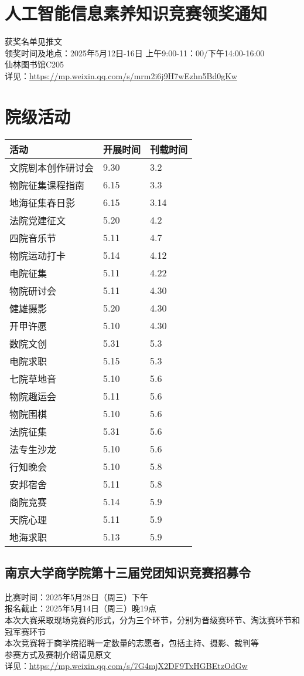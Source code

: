 \documentclass[letterpaper, 12pt]{article}
\begin{document}
\begin{multicols}{2}
\section{人工智能信息素养知识竞赛领奖通知} %
获奖名单见推文
\\领奖时间及地点：2025年5月12日-16日 上午9:00-11：00/下午14:00-16:00
\\仙林图书馆C205
\\详见：\url{https://mp.weixin.qq.com/s/mrm2i6j9H7wEzhn5Bd0gKw}
\section{院级活动}
\begin{tabular}{|>{\centering\arraybackslash}m{}|m{}|m{}|}
\hline
    活动 & 开展时间 & 刊载时间\\
    \hline\hline
    文院剧本创作研讨会 & 9.30 & 3.2\\
    物院征集课程指南 & 6.15 & 3.3\\
    地海征集春日影 & 6.15 & 3.14\\
    法院党建征文 & 5.20 & 4.2\\
    四院音乐节 & 5.11 & 4.7\\
    物院运动打卡 & 5.14 & 4.12\\
    电院征集 & 5.11 & 4.22\\
    物院研讨会 & 5.11 & 4.30\\
    健雄摄影 & 5.20 & 4.30\\
    开甲许愿 & 5.10 & 4.30\\
    数院文创 & 5.31 & 5.3\\
    电院求职 & 5.15 & 5.3\\
    七院草地音 & 5.10 & 5.6\\
    物院趣运会 & 5.11 & 5.6\\
    物院围棋 & 5.10 & 5.6\\
    法院征集 & 5.31 & 5.6\\
    法专生沙龙 & 5.10 & 5.6\\
    行知晚会 & 5.10 & 5.8\\
    安邦宿舍 & 5.11 & 5.8\\
    商院竞赛 & 5.14 & 5.9\\
    天院心理 & 5.11 & 5.9\\
    地海求职 & 5.13 & 5.9\\
    \hline
\end{tabular}
\subsection{南京大学商学院第十三届党团知识竞赛招募令} %
比赛时间：2025年5月28日（周三）下午
\\报名截止：2025年5月14日（周三）晚19点
\\本次大赛采取现场竞赛的形式，分为三个环节，分别为晋级赛环节、淘汰赛环节和冠军赛环节
\\本次竞赛将于商学院招聘一定数量的志愿者，包括主持、摄影、裁判等
\\参赛方式及赛制介绍请见原文
\\详见：\url{https://mp.weixin.qq.com/s/7G4mjX2DF9TxHGBEtzOdGw}


\end{multicols}
\end{document}
